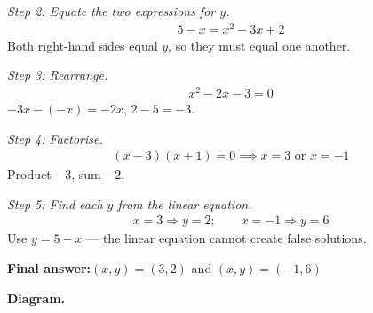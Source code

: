 \documentclass[11pt]{article}
\begin{document}
\textit{Step 2: Equate the two expressions for \( y \).}
\[\begin{gathered}
5 - x = x^2 - 3x + 2
\end{gathered}\]
Both right-hand sides equal \( y \), so they must equal one another.

\textit{Step 3: Rearrange.}
\[\begin{gathered}
x^2 - 2x - 3 = 0
\end{gathered}\]
\( -3x - (-x) = -2x \), \( 2 - 5 = -3 \).

\textit{Step 4: Factorise.}
\[\begin{gathered}
(x - 3)(x + 1) = 0 \implies x = 3 \text{ or } x = -1
\end{gathered}\]
Product \( -3 \), sum \( -2 \).

\textit{Step 5: Find each \( y \) from the linear equation.}
\[\begin{gathered}
x = 3 \Rightarrow y = 2; \qquad x = -1 \Rightarrow y = 6
\end{gathered}\]
Use \( y = 5 - x \) --- the linear equation cannot create false solutions.

\begin{answerbox}
\textbf{Final answer:}\quad \(\displaystyle (x, y) = (3, 2)\) and \(\displaystyle (x, y) = (-1, 6)\)
\end{answerbox}
\textbf{Diagram.}
\end{document}
